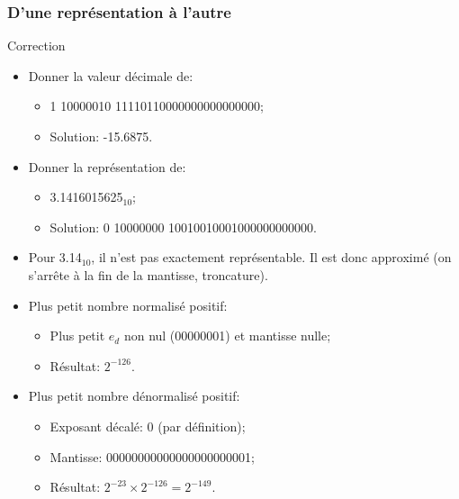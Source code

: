 \documentclass{beamer}
\begin{document}
\begin{frame}
	\frametitle{D'une représentation à l'autre}
	\vspace{-1.2cm}
	\begin{block}{Correction}
		\begin{itemize}
			\item Donner la valeur décimale de:
			\begin{itemize}
				\item 1 10000010 11110110000000000000000;
				\item Solution: -15.6875.
			\end{itemize}
			
			\item Donner la représentation de:
			\begin{itemize}
				\item 3.1416015625$_{10}$;
				\item Solution: 0 10000000 10010010001000000000000.
			\end{itemize}
			
			\item Pour 3.14$_{10}$, il n'est pas exactement représentable. Il est donc
			approximé (on s'arrête à la fin de la mantisse, troncature).
			
			\item Plus petit nombre normalisé positif:
			\begin{itemize}
				\item Plus petit $e_d$ non nul (00000001) et mantisse nulle;
				\item Résultat: $2^{-126}$.
			\end{itemize}    
			
			\item Plus petit nombre dénormalisé positif:
			\begin{itemize}
				\item Exposant décalé: 0 (par définition);
				\item Mantisse: 00000000000000000000001;
				\item Résultat: $2^{-23}\times{}2^{-126}=2^{-149}$.
			\end{itemize}
		\end{itemize}
	\end{block}
\end{frame}
\end{document}
